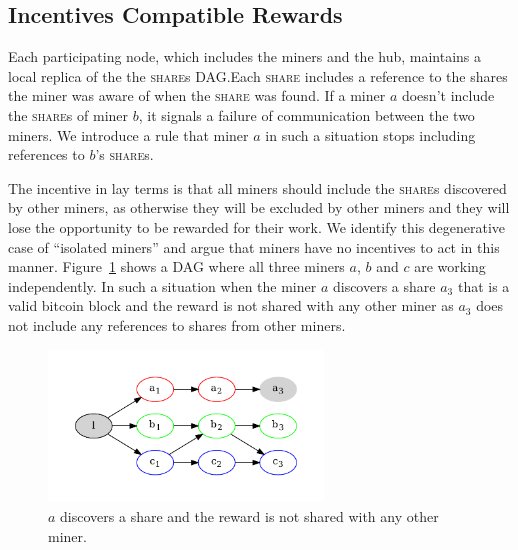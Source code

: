 \documentclass{article}
\begin{document}
  
  
\subsection{Incentives Compatible Rewards}\label{sec:rewards}

Each participating node, which includes the miners and the hub,
maintains a local replica of the the \textsc{share}s DAG.\@ Each
\textsc{share} includes a reference to the shares the miner was aware
of when the \textsc{share} was found. If a miner $a$ doesn't include
the \textsc{share}s of miner $b$, it signals a failure of
communication between the two miners. We introduce a rule that miner
$a$ in such a situation stops including references to $b$'s
\textsc{share}s.

The incentive in lay terms is that all miners should include the
\textsc{share}s discovered by other miners, as otherwise they will be
excluded by other miners and they will lose the opportunity to be
rewarded for their work. We identify this degenerative case of
``isolated miners'' and argue that miners have no incentives to act in
this manner. Figure~\ref{fig:isolated-miners} shows a DAG where all
three miners $a$, $b$ and $c$ are working independently. In such a
situation when the miner $a$ discovers a share $a_3$ that is a valid
bitcoin block and the reward is not shared with any other miner as
$a_3$ does not include any references to shares from other miners.

\begin{figure}
  \begin{center}
    \includegraphics[width=0.65\textwidth]{isolated-miners}
    \caption{$a$ discovers a share and the reward is not shared with any
      other miner.}\label{fig:isolated-miners}
  \end{center}    
\end{figure}
\end{document}
